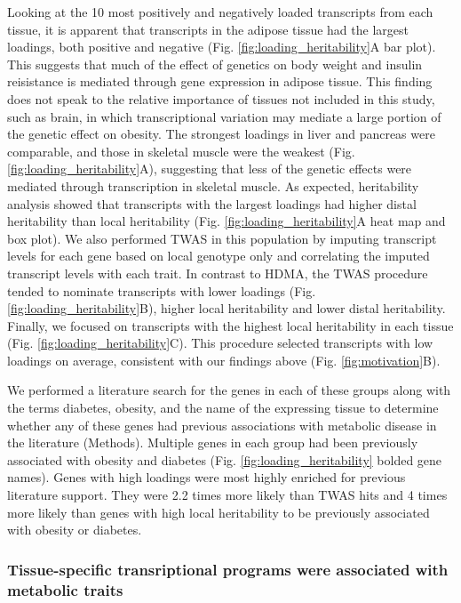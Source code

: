 \documentclass[
]{article}
\begin{document}
Looking at the 10 most positively and negatively loaded transcripts from
each tissue, it is apparent that transcripts in the adipose tissue had
the largest loadings, both positive and negative (Fig.
\ref{fig:loading_heritability}A bar plot). This suggests that much of
the effect of genetics on body weight and insulin reisistance is
mediated through gene expression in adipose tissue. This finding does
not speak to the relative importance of tissues not included in this
study, such as brain, in which transcriptional variation may mediate a
large portion of the genetic effect on obesity. The strongest loadings
in liver and pancreas were comparable, and those in skeletal muscle were
the weakest (Fig. \ref{fig:loading_heritability}A), suggesting that less
of the genetic effects were mediated through transcription in skeletal
muscle. As expected, heritability analysis showed that transcripts with
the largest loadings had higher distal heritability than local
heritability (Fig. \ref{fig:loading_heritability}A heat map and box
plot). We also performed TWAS in this population by imputing transcript
levels for each gene based on local genotype only and correlating the
imputed transcript levels with each trait. In contrast to HDMA, the TWAS
procedure tended to nominate transcripts with lower loadings (Fig.
\ref{fig:loading_heritability}B), higher local heritability and lower
distal heritability. Finally, we focused on transcripts with the highest
local heritability in each tissue (Fig.
\ref{fig:loading_heritability}C). This procedure selected transcripts
with low loadings on average, consistent with our findings above (Fig.
\ref{fig:motivation}B).

We performed a literature search for the genes in each of these groups
along with the terms diabetes, obesity, and the name of the expressing
tissue to determine whether any of these genes had previous associations
with metabolic disease in the literature (Methods). Multiple genes in
each group had been previously associated with obesity and diabetes
(Fig. \ref{fig:loading_heritability} bolded gene names). Genes with high
loadings were most highly enriched for previous literature support. They
were 2.2 times more likely than TWAS hits and 4 times more likely than
genes with high local heritability to be previously associated with
obesity or diabetes.

\subsubsection{Tissue-specific transriptional programs were associated
with metabolic
traits}\label{tissue-specific-transriptional-programs-were-associated-with-metabolic-traits}
\end{document}

